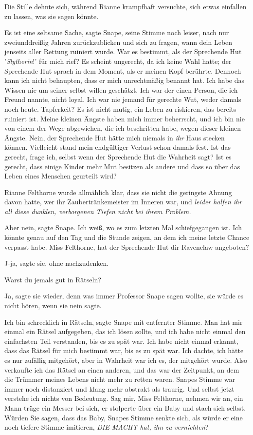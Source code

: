 Die Stille dehnte sich, während Rianne krampfhaft versuchte, sich etwas
einfallen zu lassen, was sie sagen könnte.

\glqq Es ist eine seltsame Sache\grqq{}, sagte Snape, seine Stimme noch leiser,
\glqq nach nur zweiunddreißig Jahren zurückzublicken und sich zu fragen, wann
dein Leben jenseits aller Rettung ruiniert wurde. War es bestimmt, als der
Sprechende Hut '\emph{Slytherin}!' für mich rief? Es scheint ungerecht, da ich
keine Wahl hatte; der Sprechende Hut sprach in dem Moment, als er meinen Kopf
berührte. Dennoch kann ich nicht behaupten, dass er mich unrechtmäßig benannt
hat. Ich habe das Wissen nie um seiner selbst willen geschätzt. Ich war der
einen Person, die ich Freund nannte, nicht loyal. Ich war nie jemand für
gerechte Wut, weder damals noch heute. Tapferkeit? Es ist nicht mutig, ein Leben
zu riskieren, das bereits ruiniert ist. Meine kleinen Ängste haben mich immer
beherrscht, und ich bin nie von einem der Wege abgewichen, die ich beschritten
habe, wegen dieser kleinen Ängste. Nein, der Sprechende Hut hätte mich niemals
in \emph{ihr} Haus stecken können. Vielleicht stand mein endgültiger Verlust
schon damals fest. Ist das gerecht, frage ich, selbst wenn der Sprechende Hut
die Wahrheit sagt? Ist es gerecht, dass einige Kinder mehr Mut besitzen als
andere und dass so über das Leben eines Menschen geurteilt wird?\grqq{}

Rianne Felthorne wurde allmählich klar, dass sie nicht die geringste Ahnung
davon hatte, wer ihr Zaubertränkemeister im Inneren war, und \emph{leider halfen
ihr all diese dunklen, verborgenen Tiefen nicht bei ihrem Problem.}

\glqq Aber nein\grqq{}, sagte Snape. \glqq Ich weiß, wo es zum letzten Mal
schiefgegangen ist. Ich könnte genau auf den Tag und die Stunde zeigen, an dem
ich meine letzte Chance verpasst habe. Miss Felthorne, hat der Sprechende Hut
dir Ravenclaw angeboten?\grqq{}

\glqq J-ja\grqq{}, sagte sie, ohne nachzudenken.

\glqq Warst du jemals gut in Rätseln?\grqq{}

\glqq Ja\grqq{}, sagte sie wieder, denn was immer Professor Snape sagen wollte,
sie würde es nicht hören, wenn sie nein sagte.

\glqq Ich bin schrecklich in Rätseln\grqq{}, sagte Snape mit entfernter Stimme.
\glqq Man hat mir einmal ein Rätsel aufgegeben, das ich lösen sollte, und ich
habe nicht einmal den einfachsten Teil verstanden, bis es zu spät war. Ich habe
nicht einmal erkannt, dass das Rätsel für mich bestimmt war, bis es zu spät war.
Ich dachte, ich hätte es nur zufällig mitgehört, aber in Wahrheit war ich es,
der mitgehört wurde. Also verkaufte ich das Rätsel an einen anderen, und das war
der Zeitpunkt, an dem die Trümmer meines Lebens nicht mehr zu retten
waren.\grqq{} Snapes Stimme war immer noch distanziert und klang mehr abstrakt
als traurig. \glqq Und selbst jetzt verstehe ich nichts von Bedeutung. Sag mir,
Miss Felthorne, nehmen wir an, ein Mann trüge ein Messer bei sich, er stolperte
über ein Baby und stach sich selbst. Würden Sie sagen, dass das Baby\grqq{},
Snapes Stimme senkte sich, als würde er eine noch tiefere Stimme imitieren,
\glqq \emph{DIE MACHT hat, ihn zu vernichten}?\grqq{}


